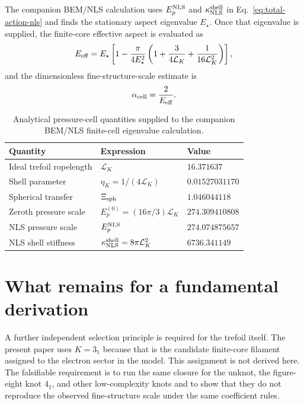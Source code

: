 \documentclass[11pt]{article}
\newcommand{\EpNLS}{E_p^{\rm NLS}}
\newcommand{\kappaNLS}{\kappa_{\rm NLS}^{\rm shell}}
\begin{document}
The companion BEM/NLS calculation uses \(\EpNLS\) and \(\kappaNLS\) in
Eq.~\eqref{eq:total-action-nls} and finds the stationary aspect eigenvalue \(E_\star\).  Once
that eigenvalue is supplied, the finite-core effective aspect is evaluated as
\begin{equation}
  E_{\rm eff}
  =
  E_\star
  \left[
  1-
  \frac{\pi}{4E_\star^2}
  \left(
  1+\frac{3}{4\mathcal L_K}+\frac{1}{16\mathcal L_K^2}
  \right)
  \right],
  \label{eq:Eeff-star}
\end{equation}
and the dimensionless fine-structure-scale estimate is
\begin{equation}
  \alpha_{\rm cell}=\frac{2}{E_{\rm eff}}.
  \label{eq:alpha-star}
\end{equation}

\begin{table}[h]
\centering
\caption{Analytical pressure-cell quantities supplied to the companion BEM/NLS finite-cell eigenvalue calculation.}
\begin{tabular}{@{}lll@{}}
\toprule
Quantity & Expression & Value \\
\midrule
Ideal trefoil ropelength & \(\mathcal L_K\) & \(16.371637\) \\
Shell parameter & \(\eta_K=1/(4\mathcal L_K)\) & \(0.01527031170\) \\
Spherical transfer & \(\Xi_{\rm sph}\) & \(1.046044118\) \\
Zeroth pressure scale & \(E_p^{(0)}=(16\pi/3)\mathcal L_K\) & \(274.309410808\) \\
NLS pressure scale & \(\EpNLS\) & \(274.074875657\) \\
NLS shell stiffness & \(\kappaNLS=8\pi\mathcal L_K^2\) & \(6736.341149\) \\
\bottomrule
\end{tabular}
\label{tab:nls-pressure}
\end{table}

\section{What remains for a fundamental derivation}

A further independent selection principle is required for the trefoil itself.
The present paper uses \(K=3_1\) because that is the candidate finite-core
filament assigned to the electron sector in the model.  This assignment is not
derived here.  The falsifiable requirement is to run the same closure for the
unknot, the figure-eight knot \(4_1\), and other low-complexity knots and to
show that they do not reproduce the observed fine-structure scale under the
same coefficient rules.
\end{document}
